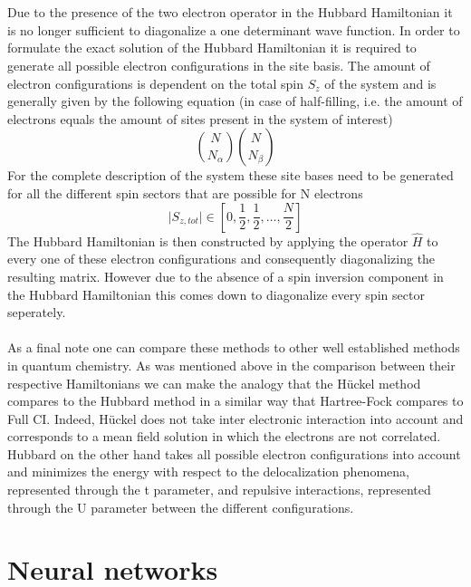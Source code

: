 \documentclass[12pt]{article}
\begin{document}
\\
\\
Due to the presence of the two electron operator in the Hubbard Hamiltonian it is no longer sufficient to diagonalize a one determinant wave function. In order to formulate the exact solution of the Hubbard Hamiltonian it is required to generate all possible electron configurations in the site basis. The amount of electron configurations is dependent on the total spin $S_z$ of the system and is generally given by the following equation (in case of half-filling, i.e. the amount of electrons equals the amount of sites present in the system of interest)
\begin{equation}
\binom{N}{N_{\alpha}}\binom{N}{N_{\beta}}
\end{equation}  
For the complete description of the system these site bases need to be generated for all the different spin sectors that are possible for N electrons
\begin{equation}
\lvert S_{z,tot} \rvert \in \left[ 0,\frac{1}{2},\frac{1}{2}, \dots, \frac{N}{2} \right]
\end{equation}
The Hubbard Hamiltonian is then constructed by applying the operator $\hat{H}$ to every one of these electron configurations and consequently diagonalizing the resulting matrix.
However due to the absence of a spin inversion component in the Hubbard Hamiltonian this comes down to diagonalize every spin sector seperately.
\\
\\
As a final note one can compare these methods to other well established methods in quantum chemistry. As was mentioned above in the comparison between their respective Hamiltonians we can make the analogy that the Hückel method compares to the Hubbard method in a similar way that Hartree-Fock compares to Full CI. Indeed, Hückel does not take inter electronic interaction into account and corresponds to a mean field solution in which the electrons are not correlated. Hubbard on the other hand takes all possible electron configurations into account and minimizes the energy with respect to the delocalization phenomena, represented through the t parameter, and repulsive interactions, represented through the U parameter between the different configurations.  

\newpage
\section{Neural networks}
\end{document}
